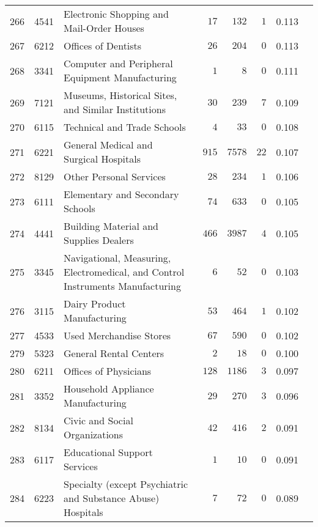\documentclass[9pt, oneside]{article}   	%
\begin{document}
\begin{longtable}{lcp{3 in}ccccc}
266  & 4541 & Electronic Shopping and Mail-Order Houses & $\phantom{00}17$ & $\phantom{0}132$ & $\phantom{0}1$ & 0.113 \\
267  & 6212 & Offices of Dentists & $\phantom{00}26$ & $\phantom{0}204$ & $\phantom{0}0$ & 0.113 \\
268  & 3341 & Computer and Peripheral Equipment Manufacturing & $\phantom{000}1$ & $\phantom{000}8$ & $\phantom{0}0$ & 0.111 \\
269  & 7121 & Museums, Historical Sites, and Similar Institutions & $\phantom{00}30$ & $\phantom{0}239$ & $\phantom{0}7$ & 0.109 \\
270  & 6115 & Technical and Trade Schools & $\phantom{000}4$ & $\phantom{00}33$ & $\phantom{0}0$ & 0.108 \\
271  & 6221 & General Medical and Surgical Hospitals & $\phantom{0}915$ & $7578$ & $22$ & 0.107 \\
272  & 8129 & Other Personal Services & $\phantom{00}28$ & $\phantom{0}234$ & $\phantom{0}1$ & 0.106 \\
273  & 6111 & Elementary and Secondary Schools & $\phantom{00}74$ & $\phantom{0}633$ & $\phantom{0}0$ & 0.105 \\
274  & 4441 & Building Material and Supplies Dealers & $\phantom{0}466$ & $3987$ & $\phantom{0}4$ & 0.105 \\
275  & 3345 & Navigational, Measuring, Electromedical, and Control Instruments Manufacturing & $\phantom{000}6$ & $\phantom{00}52$ & $\phantom{0}0$ & 0.103 \\
276  & 3115 & Dairy Product Manufacturing & $\phantom{00}53$ & $\phantom{0}464$ & $\phantom{0}1$ & 0.102 \\
277  & 4533 & Used Merchandise Stores & $\phantom{00}67$ & $\phantom{0}590$ & $\phantom{0}0$ & 0.102 \\

279  & 5323 & General Rental Centers & $\phantom{000}2$ & $\phantom{00}18$ & $\phantom{0}0$ & 0.100 \\
280  & 6211 & Offices of Physicians & $\phantom{0}128$ & $1186$ & $\phantom{0}3$ & 0.097 \\
281  & 3352 & Household Appliance Manufacturing & $\phantom{00}29$ & $\phantom{0}270$ & $\phantom{0}3$ & 0.096 \\
282  & 8134 & Civic and Social Organizations & $\phantom{00}42$ & $\phantom{0}416$ & $\phantom{0}2$ & 0.091 \\
283  & 6117 & Educational Support Services & $\phantom{000}1$ & $\phantom{00}10$ & $\phantom{0}0$ & 0.091 \\
284  & 6223 & Specialty (except Psychiatric and Substance Abuse) Hospitals & $\phantom{000}7$ & $\phantom{00}72$ & $\phantom{0}0$ & 0.089 \\


\end{longtable}
\end{document}
